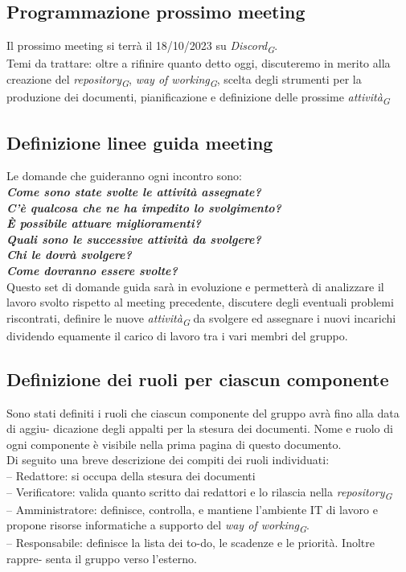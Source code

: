 \documentclass{article}
\begin{document}
    \subsection{Programmazione prossimo meeting}
        Il prossimo meeting si terrà il 18/10/2023 su \textit{Discord}\textsubscript{\textit{G}}. \\ 
        Temi da trattare: oltre a rifinire quanto detto oggi, discuteremo in merito alla creazione del \textit{repository}\textsubscript{\textit{G}}, \textit{way of working}\textsubscript{\textit{G}}, scelta degli strumenti per la produzione dei documenti, pianificazione e definizione delle prossime \textit{attività}\textsubscript{\textit{G}} 

    \subsection{Definizione linee guida meeting}
        Le domande che guideranno ogni incontro sono:\\ 
        \textbf{\textit{Come sono state svolte le attività assegnate?\\C’è qualcosa che ne ha impedito lo svolgimento?\\ È possibile attuare miglioramenti?\\
        Quali sono le successive attività da svolgere?\\ Chi le dovrà svolgere?\\ Come dovranno essere svolte?}}\\
        Questo set di domande guida sarà in evoluzione e permetterà di analizzare il lavoro svolto rispetto al meeting precedente, discutere degli eventuali problemi riscontrati, definire le nuove \textit{attività}\textsubscript{\textit{G}} da svolgere ed assegnare i nuovi incarichi dividendo equamente il carico di lavoro tra i vari membri del gruppo. 

    \subsection{Definizione dei ruoli per ciascun componente}
        Sono stati definiti i ruoli che ciascun componente del gruppo avrà fino alla data di aggiu- dicazione degli appalti per la stesura dei documenti. Nome e ruolo di ogni componente è visibile nella prima pagina di questo documento. \\ 
        Di seguito una breve descrizione dei compiti dei ruoli individuati:\\– Redattore: si occupa della stesura dei documenti\\ 
        – Verificatore: valida quanto scritto dai redattori e lo rilascia nella \textit{repository}\textsubscript{\textit{G}}\\
        – Amministratore: definisce, controlla, e mantiene l’ambiente IT di lavoro e propone risorse informatiche a supporto del \textit{way of working}\textsubscript{\textit{G}}.\\
        – Responsabile: definisce la lista dei to-do, le scadenze e le priorità. Inoltre rappre- senta il gruppo verso l’esterno. 
\end{document}
